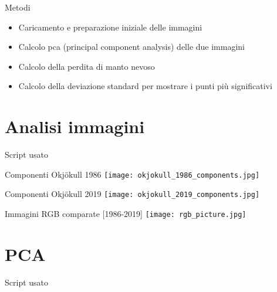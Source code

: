 \documentclass{beamer}
\begin{document}
\begin{frame}{Metodi}
\begin{itemize}
    \item Caricamento e preparazione iniziale delle immagini
    
    \bigskip
    
    \item \pause Calcolo pca (principal component analysis) delle due immagini
    
    \bigskip
    
    \item \pause Calcolo della perdita di manto nevoso
    
    \bigskip
    
    \item \pause Calcolo della deviazione standard per mostrare i punti più significativi
\end{itemize}    
\end{frame}

\section{Analisi immagini}

\begin{frame}{Script usato}
    \begin{tiny}
        
    \end{tiny}
\end{frame}

\begin{frame}{Componenti Okjökull 1986}
    \texttt{[image: okjokull\_1986\_components.jpg]}
    \centering
\end{frame}

\begin{frame}{Componenti Okjökull 2019}
    \texttt{[image: okjokull\_2019\_components.jpg]}
    \centering
\end{frame}

\begin{frame}{Immagini RGB comparate [1986-2019]}
    \texttt{[image: rgb\_picture.jpg]}
    \centering
\end{frame}

\section{PCA}

\begin{frame}{Script usato}
    \begin{tiny}
        
    \end{tiny}
\end{frame}
\end{document}

